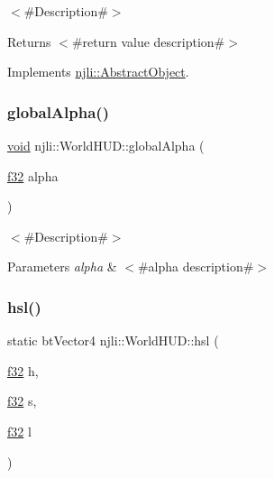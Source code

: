 $<$\#\+Description\#$>$

\begin{DoxyReturn}{Returns}
$<$\#return value description\#$>$ 
\end{DoxyReturn}


Implements \mbox{\hyperlink{classnjli_1_1_abstract_object_a08dcf202a47f0782813b8bc98c659e78}{njli\+::\+Abstract\+Object}}.

\mbox{\label{classnjli_1_1_world_h_u_d_a2b1d005bd81d9e0b42a404c48ceb7cf9}} 
\subsubsection{\texorpdfstring{global\+Alpha()}{globalAlpha()}}
{\footnotesize\ttfamily \mbox{\hyperlink{_thread_8h_af1e856da2e658414cb2456cb6f7ebc66}{void}} njli\+::\+World\+H\+U\+D\+::global\+Alpha (\begin{DoxyParamCaption}\item[{\mbox{\hyperlink{_util_8h_a5f6906312a689f27d70e9d086649d3fd}{f32}}}]{alpha }\end{DoxyParamCaption})}

$<$\#\+Description\#$>$


\begin{DoxyParams}{Parameters}
{\em alpha} & $<$\#alpha description\#$>$ \\
\hline
\end{DoxyParams}
\mbox{\label{classnjli_1_1_world_h_u_d_aa8eef5943b4d463a8567351856430131}} 
\subsubsection{\texorpdfstring{hsl()}{hsl()}}
{\footnotesize\ttfamily static bt\+Vector4 njli\+::\+World\+H\+U\+D\+::hsl (\begin{DoxyParamCaption}\item[{\mbox{\hyperlink{_util_8h_a5f6906312a689f27d70e9d086649d3fd}{f32}}}]{h,  }\item[{\mbox{\hyperlink{_util_8h_a5f6906312a689f27d70e9d086649d3fd}{f32}}}]{s,  }\item[{\mbox{\hyperlink{_util_8h_a5f6906312a689f27d70e9d086649d3fd}{f32}}}]{l }\end{DoxyParamCaption})\hspace{0.3cm}{\ttfamily [static]}}

